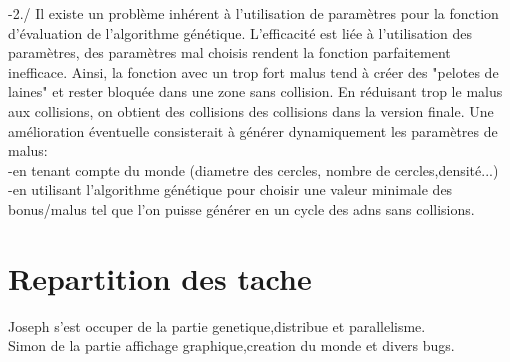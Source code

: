 \documentclass{article}
\begin{document}
        -2./ Il existe un problème inhérent à l'utilisation de paramètres pour la
        fonction d'évaluation de l'algorithme génétique. L'efficacité est liée à
        l'utilisation des paramètres, des paramètres mal choisis rendent la
        fonction parfaitement inefficace. Ainsi, la fonction avec un trop fort
        malus tend à créer des "pelotes de laines" et rester bloquée dans une
        zone sans collision. En réduisant trop le malus aux collisions, on
        obtient des collisions des collisions dans la version finale.
        Une amélioration éventuelle consisterait à générer dynamiquement les
        paramètres de malus:\\
                -en tenant compte du monde (diametre des cercles, nombre de
                cercles,densité...)\\
                -en utilisant l'algorithme génétique pour choisir une valeur minimale des bonus/malus tel que l'on puisse générer en un
                cycle des adns sans
                collisions.




\section{Repartition des tache} %
\label{sec:Repartiotion des tache}
Joseph s'est occuper de la partie genetique,distribue et parallelisme.\\
Simon de la partie affichage graphique,creation du monde et divers bugs.
\end{document}
